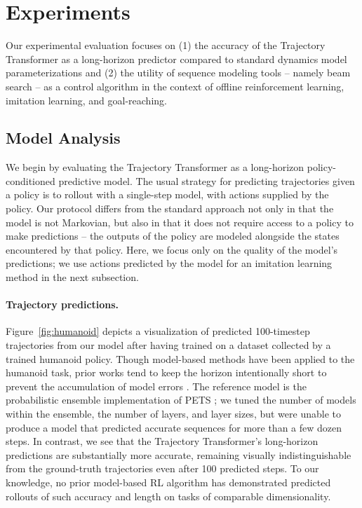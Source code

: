 

\vspace{-.2cm}
\section{Experiments}
\label{sec:experiments}
\vspace{-.1cm}

Our experimental evaluation focuses on (1) the accuracy of the Trajectory Transformer as a long-horizon predictor compared to standard dynamics model parameterizations and (2) the utility of sequence modeling tools -- namely beam search -- as a control algorithm in the context of offline reinforcement learning, imitation learning, and goal-reaching.

\vspace{-.05cm}
\subsection{Model Analysis}
\vspace{-.05cm}

We begin by evaluating the Trajectory Transformer
as a long-horizon policy-conditioned predictive model.
The usual strategy for predicting trajectories given a policy is to rollout with a single-step model, with actions supplied by the policy.
Our protocol differs from the standard approach not only in that the model is not Markovian, but also in that it does not require access to a policy to make predictions -- the outputs of the policy are modeled alongside the states encountered by that policy.
Here, we focus only on the quality of the model's predictions; we use actions predicted by the model for an imitation learning method in the next subsection.



\paragraph{Trajectory predictions.}
Figure~\ref{fig:humanoid} depicts a visualization of predicted 100-timestep trajectories from our model after having trained on a dataset collected by a trained humanoid policy.
Though model-based methods have been applied to the humanoid task, prior works tend to keep the horizon intentionally short to prevent the accumulation of model errors \citep{janner2019mbpo,amos2020model}.
The reference model is the probabilistic ensemble implementation of PETS \citep{chua2018pets}; we tuned the number of models within the ensemble, the number of layers, and layer sizes, but were unable to produce a model that predicted accurate sequences for more than a few dozen steps.
In contrast, we see that the Trajectory Transformer's
long-horizon predictions are substantially more accurate, remaining visually indistinguishable from the ground-truth trajectories even after 100 predicted steps.
To our knowledge, no prior model-based RL algorithm has demonstrated predicted rollouts of such accuracy and length on tasks of comparable dimensionality.

